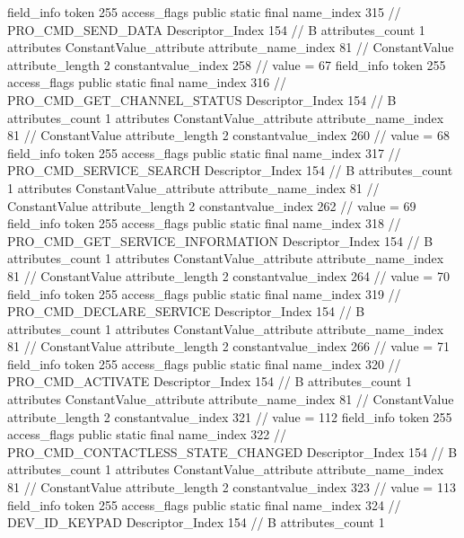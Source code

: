 {{{{{{{				}
				}
			}
			field_info {
				token	255
				access_flags	public static final
				name_index	315		// PRO_CMD_SEND_DATA
				Descriptor_Index	154		// B
				attributes_count	1
				attributes {
				ConstantValue_attribute {
					attribute_name_index	81		// ConstantValue
					attribute_length	2
					constantvalue_index	258		// value = 67
				}
				}
			}
			field_info {
				token	255
				access_flags	public static final
				name_index	316		// PRO_CMD_GET_CHANNEL_STATUS
				Descriptor_Index	154		// B
				attributes_count	1
				attributes {
				ConstantValue_attribute {
					attribute_name_index	81		// ConstantValue
					attribute_length	2
					constantvalue_index	260		// value = 68
				}
				}
			}
			field_info {
				token	255
				access_flags	public static final
				name_index	317		// PRO_CMD_SERVICE_SEARCH
				Descriptor_Index	154		// B
				attributes_count	1
				attributes {
				ConstantValue_attribute {
					attribute_name_index	81		// ConstantValue
					attribute_length	2
					constantvalue_index	262		// value = 69
				}
				}
			}
			field_info {
				token	255
				access_flags	public static final
				name_index	318		// PRO_CMD_GET_SERVICE_INFORMATION
				Descriptor_Index	154		// B
				attributes_count	1
				attributes {
				ConstantValue_attribute {
					attribute_name_index	81		// ConstantValue
					attribute_length	2
					constantvalue_index	264		// value = 70
				}
				}
			}
			field_info {
				token	255
				access_flags	public static final
				name_index	319		// PRO_CMD_DECLARE_SERVICE
				Descriptor_Index	154		// B
				attributes_count	1
				attributes {
				ConstantValue_attribute {
					attribute_name_index	81		// ConstantValue
					attribute_length	2
					constantvalue_index	266		// value = 71
				}
				}
			}
			field_info {
				token	255
				access_flags	public static final
				name_index	320		// PRO_CMD_ACTIVATE
				Descriptor_Index	154		// B
				attributes_count	1
				attributes {
				ConstantValue_attribute {
					attribute_name_index	81		// ConstantValue
					attribute_length	2
					constantvalue_index	321		// value = 112
				}
				}
			}
			field_info {
				token	255
				access_flags	public static final
				name_index	322		// PRO_CMD_CONTACTLESS_STATE_CHANGED
				Descriptor_Index	154		// B
				attributes_count	1
				attributes {
				ConstantValue_attribute {
					attribute_name_index	81		// ConstantValue
					attribute_length	2
					constantvalue_index	323		// value = 113
				}
				}
			}
			field_info {
				token	255
				access_flags	public static final
				name_index	324		// DEV_ID_KEYPAD
				Descriptor_Index	154		// B
				attributes_count	1
}}}}}
